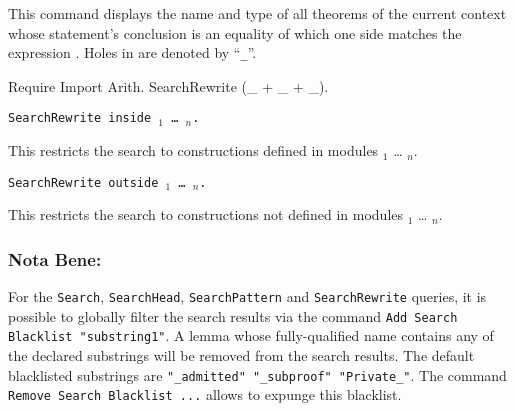This command displays the name and type of all theorems of the current
context whose statement's conclusion is an equality of which one side matches
the expression {\term}. Holes in {\term} are denoted by ``{\texttt \_}''.

\begin{coq_example}
Require Import Arith.
SearchRewrite (_ + _ + _).
\end{coq_example}

\begin{Variants}
\item {\tt SearchRewrite {\term} inside
{\module$_1$} \ldots{} {\module$_n$}.}

This restricts the search to constructions defined in modules
{\module$_1$} \ldots{} {\module$_n$}.

\item {\tt SearchRewrite {\term} outside {\module$_1$} \ldots{} {\module$_n$}.}

This restricts the search to constructions not defined in modules
{\module$_1$} \ldots{} {\module$_n$}.

\end{Variants}

\subsubsection{Nota Bene:}
For the {\tt Search}, {\tt SearchHead}, {\tt SearchPattern} and
{\tt SearchRewrite} queries, it is possible to globally filter
the search results via the command
{\tt Add Search Blacklist "substring1"}.
A lemma whose fully-qualified name contains any of the declared substrings
will be removed from the search results.
The default blacklisted substrings are {\tt "\_admitted"
  "\_subproof" "Private\_"}. The command {\tt Remove Search Blacklist
  ...} allows to expunge this blacklist.


